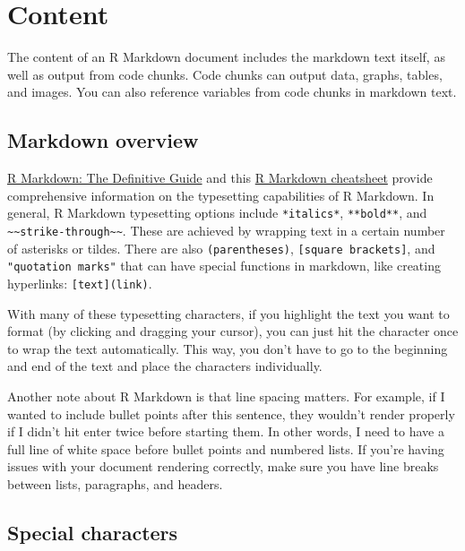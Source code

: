 \documentclass[
  openany]{book}
\begin{document}
\hypertarget{content}{%
\chapter{Content}\label{content}}

The content of an R Markdown document includes the markdown text itself, as well as output from code chunks. Code chunks can output data, graphs, tables, and images. You can also reference variables from code chunks in markdown text.

\hypertarget{markdown-overview}{%
\section{Markdown overview}\label{markdown-overview}}

\href{https://bookdown.org/yihui/rmarkdown/markdown-syntax.html}{R Markdown: The Definitive Guide} and this \href{https://rstudio.com/wp-content/uploads/2015/02/rmarkdown-cheatsheet.pdf}{R Markdown cheatsheet} provide comprehensive information on the typesetting capabilities of R Markdown. In general, R Markdown typesetting options include \texttt{*italics*}, \texttt{**bold**}, and \texttt{\textasciitilde{}\textasciitilde{}strike-through\textasciitilde{}\textasciitilde{}}. These are achieved by wrapping text in a certain number of asterisks or tildes. There are also \texttt{(parentheses)}, \texttt{{[}square\ brackets{]}}, and \texttt{"quotation\ marks"} that can have special functions in markdown, like creating hyperlinks: \texttt{{[}text{]}(link)}.

With many of these typesetting characters, if you highlight the text you want to format (by clicking and dragging your cursor), you can just hit the character once to wrap the text automatically. This way, you don't have to go to the beginning and end of the text and place the characters individually.

Another note about R Markdown is that line spacing matters. For example, if I wanted to include bullet points after this sentence, they wouldn't render properly if I didn't hit enter twice before starting them. In other words, I need to have a full line of white space before bullet points and numbered lists. If you're having issues with your document rendering correctly, make sure you have line breaks between lists, paragraphs, and headers.

\hypertarget{special-characters}{%
\section{Special characters}\label{special-characters}}
\end{document}
